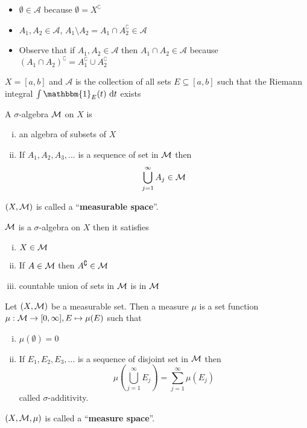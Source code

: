 \begin{remark}
  \begin{itemize}
    \item $\emptyset \in \mathcal{A}$ because $\emptyset = X^\complement$
    \item $A_1, A_2 \in \mathcal{A}$, $A_1 \setminus A_2 = A_1 \cap A_2^\complement \in \mathcal{A}$
    \item Observe that if $A_1, A_2 \in \mathcal{A}$ then $A_1 \cap A_2 \in \mathcal{A}$ because $(A_1 \cap A_2)^\complement = A_1^\complement \cup A_2^\complement$
  \end{itemize}
\end{remark}

\begin{example}
  $X = [a, b]$ and $\mathcal{A}$ is the collection of all sets $E \subseteq [a, b]$  
  such that the Riemann integral 
  $\int \mathbbm{1}_E(t) \ \mathrm{d}t$
 exists
\end{example}


\begin{definition}
  A $\sigma$-algebra $\mathcal M$ on $X$ is 
  \begin{enumerate}[(i)]
    \item an algebra of subsets of $X$
    \item If $A_1, A_2, A_3, \dotsc$ is a sequence of set in $\mathcal M$ then
    \[\bigcup_{j = 1}^\infty A_j \in \mathcal M\]
  \end{enumerate}
  $(X, \mathcal M)$ is called a ``\textbf{measurable space}''.
\end{definition}

\begin{remark}
  $\mathcal M$ is a $\sigma$-algebra on $X$ then it satisfies
  \begin{enumerate}[(i)] 
    \item $X \in \mathcal M$
    \item If $A \in \mathcal M$ then $A^\complement \in \mathcal M$
    \item countable union of sets in $\mathcal M$ is in $\mathcal M$ 
  \end{enumerate}
\end{remark}

\begin{definition}
Let $(X, \mathcal M)$ be a measurable set. Then a measure $\mu$ is a set function 
$\mu: \mathcal M \to [0, \infty], E \mapsto \mu(E)$ such that
\begin{enumerate}[(i)]
  \item $\mu(\emptyset) = 0$
  \item If $E_1, E_2, E_3, \dotsc$ is a sequence of disjoint set in $\mathcal M$ then
  \[\mu\left(\bigcup_{j=1}^\infty E_j\right) = \sum_{j = 1}^\infty \mu(E_j)\]
  called $\sigma$-additivity.
\end{enumerate}
$(X, \mathcal M, \mu)$ is called a ``\textbf{measure space}''.
\end{definition}

